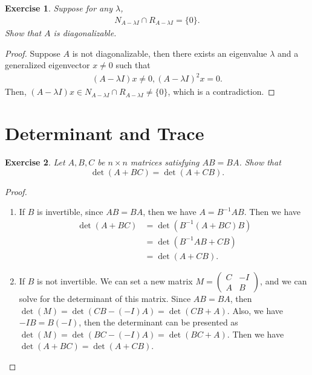 \documentclass[11pt]{book}
\newtheorem{exercise}{Exercise}[section]
\theoremstyle{definition}
\numberwithin{equation}{subsection}
\begin{document}
\medskip

\begin{exercise}{\bf *}
Suppose for any $\lambda$, 
\begin{align*}
    N_{A - \lambda I} \cap R_{A - \lambda I} = \{0\}.
\end{align*}
Show that $A$ is diagonalizable.
\end{exercise}
\begin{proof}
Suppose $A$ is not diagonalizable, then there exists an eigenvalue $\lambda$ and a generalized eigenvector $x \neq 0$ such that \cite{15}
\begin{align*}
    (A - \lambda I)x \neq 0, (A - \lambda I)^2 x = 0.
\end{align*}
Then, $(A - \lambda I)x \in N_{A - \lambda I} \cap R_{A - \lambda I} \neq \{0\}$, which is a contradiction. 
\end{proof}

\medskip

\section{Determinant and Trace}
\begin{exercise}
Let $A,B,C$ be $n\times n$ matrices satisfying $AB=BA$. Show that
$$
\det\left(  A+BC\right)  =\det\left(  A+CB\right).
$$
\end{exercise}
\begin{proof}
~\begin{enumerate}[label=(\arabic*)]
    \item If $B$ is invertible, since $AB=BA$, then we have $A=B^{-1}AB$. Then we have
    \begin{align*}
        \det (A+BC) &= \det (B^{-1}(A+BC)B) \\
        & = \det(B^{-1}AB+CB) \\
        & = \det(A+CB).
    \end{align*}
    \item If $B$ is not invertible. We can set a new matrix $M = \begin{pmatrix}
    C & -I \\
    A & B
    \end{pmatrix}$, and we can solve for the determinant of this matrix. Since $AB=BA$, then $\det(M)=\det(CB-(-I)A)=\det(CB+A)$. Also, we have $-IB=B(-I)$, then the determinant can be presented as $\det (M)=\det(BC-(-I)A)=\det(BC+A)$. Then we have $\det(A+BC)=\det(A+CB)$. 
\end{enumerate}
\end{proof}
\end{document}
